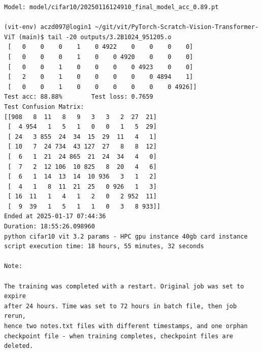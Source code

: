 \begin{verbatim}
Model: model/cifar10/20250116124910_final_model_acc_0.89.pt

(vit-env) aczd097@login1 ~/git/vit/PyTorch-Scratch-Vision-Transformer-ViT (main)$ tail -20 outputs/3.2B1024_951205.o
 [   0    0    0    1    0 4922    0    0    0    0]
 [   0    0    0    1    0    0 4920    0    0    0]
 [   0    0    1    0    0    0    0 4923    0    0]
 [   2    0    1    0    0    0    0    0 4894    1]
 [   0    0    1    0    0    0    0    0    0 4926]]
Test acc: 88.88%        Test loss: 0.7659
Test Confusion Matrix:
[[908   8  11   8   9   3   3   2  27  21]
 [  4 954   1   5   1   0   0   1   5  29]
 [ 24   3 855  24  34  15  29  11   4   1]
 [ 10   7  24 734  43 127  27   8   8  12]
 [  6   1  21  24 865  21  24  34   4   0]
 [  7   2  12 106  10 825   8  20   4   6]
 [  6   1  14  13  14  10 936   3   1   2]
 [  4   1   8  11  21  25   0 926   1   3]
 [ 16  11   1   4   1   2   0   2 952  11]
 [  9  39   1   5   1   1   0   3   8 933]]
Ended at 2025-01-17 07:44:36
Duration: 18:55:26.098960
python cifar10 vit 3.2 params - HPC gpu instance 40gb card instance script execution time: 18 hours, 55 minutes, 32 seconds

Note:

The training was completed with a restart. Original job was set to expire
after 24 hours. Time was set to 72 hours in batch file, then job rerun,
hence two notes.txt files with different timestamps, and one orphan
checkpoint file - when training completes, checkpoint files are deleted.

\end{verbatim}

